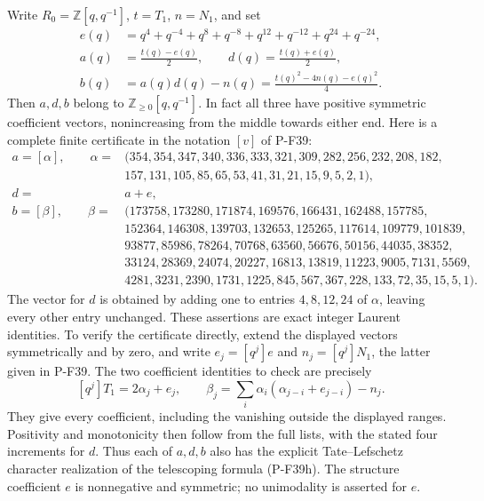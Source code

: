 \documentclass[11pt,a4paper]{article}
\begin{document}
Write $R_0=\mathbb Z[q,q^{-1}]$, $t=T_1$, $n=N_1$, and set
\[
 \begin{split}
 e(q)&=q^4+q^{-4}+q^8+q^{-8}
                    +q^{12}+q^{-12}+q^{24}+q^{-24},\\
 a(q)&=\frac{t(q)-e(q)}2,\qquad
 d(q)=\frac{t(q)+e(q)}2,\\
 b(q)&=a(q)d(q)-n(q)
       =\frac{t(q)^2-4n(q)-e(q)^2}{4}.
 \end{split}                                                    \tag{P-F52y}
\]
Then $a,d,b$ belong to $\mathbb Z_{\ge0}[q,q^{-1}]$.
In fact all three have positive symmetric coefficient vectors,
nonincreasing from the middle towards either end. Here is a
complete finite certificate in the notation $[v]$ of P-F39:
\[
 \begin{split}
 a=[\alpha],\qquad \alpha={}&
 (354,354,347,340,336,333,321,309,282,256,232,208,182,\\
 &157,131,105,85,65,53,41,31,21,15,9,5,2,1),\\
 d={}&a+e,\\
 b=[\beta],\qquad \beta={}&
 (173758,173280,171874,169576,166431,162488,157785,\\
 &152364,146308,139703,132653,125265,117614,109779,101839,\\
 &93877,85986,78264,70768,63560,56676,50156,44035,38352,\\
 &33124,28369,24074,20227,16813,13819,11223,9005,7131,5569,\\
 &4281,3231,2390,1731,1225,845,567,367,228,133,72,35,15,5,1).
 \end{split}                                                    \tag{P-F52z}
\]
The vector for $d$ is obtained by adding one to entries
$4,8,12,24$ of $\alpha$, leaving every other entry unchanged.
These assertions are exact integer Laurent identities. To verify
the certificate directly, extend the displayed vectors
symmetrically and by zero, and write $e_j=[q^j]e$ and
$n_j=[q^j]N_1$, the latter given in P-F39. The two coefficient
identities to check are precisely
\[
 [q^j]T_1=2\alpha_j+e_j,\qquad
 \beta_j=\sum_i\alpha_i(\alpha_{j-i}+e_{j-i})-n_j.
                                                               \tag{P-F52aa}
\]
They give every coefficient, including the vanishing outside
the displayed ranges. Positivity and monotonicity then follow
from the full lists, with the stated four increments for $d$.
Thus each of $a,d,b$ also has the explicit Tate--Lefschetz
character realization of the telescoping formula (P-F39h).
The structure coefficient $e$ is nonnegative and symmetric;
no unimodality is asserted for $e$.
\end{document}
